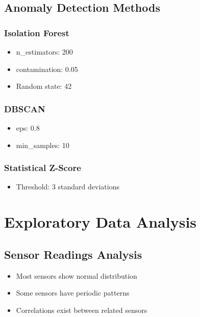 \documentclass[12pt,a4paper]{report}
\begin{document}
\section{Anomaly Detection Methods}

\subsection{Isolation Forest}
\begin{itemize}
    \item n\_estimators: 200
    \item contamination: 0.05
    \item Random state: 42
\end{itemize}

\subsection{DBSCAN}
\begin{itemize}
    \item eps: 0.8
    \item min\_samples: 10
\end{itemize}

\subsection{Statistical Z-Score}
\begin{itemize}
    \item Threshold: 3 standard deviations
\end{itemize}

\chapter{Exploratory Data Analysis}

\section{Sensor Readings Analysis}
\begin{itemize}
    \item Most sensors show normal distribution
    \item Some sensors have periodic patterns
    \item Correlations exist between related sensors
\end{itemize}
\end{document}
